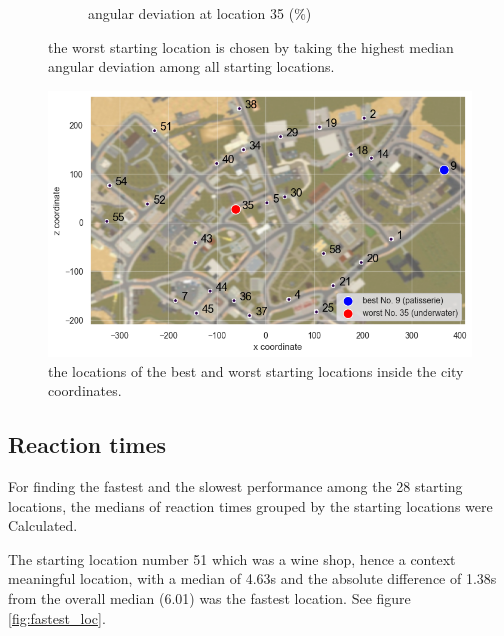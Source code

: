 \begin{figure}[!htb]
\begin{subfigure}[b]{0.48\linewidth}
		\caption{angular deviation at location 35 (\%)}
		\label{fig:worst_angular_dist_35}
	\end{subfigure}

	\caption[Worst starting location based on angular deviation]{the worst starting location is chosen by taking the highest median angular deviation among all starting locations.}
\end{figure}
\label{fig:worst_location}

\begin{figure}[!htb]
	\centering
	\includegraphics[width=140mm]{figures/best_worst_starting_locations_map.png}
	\caption[Locations of best and worst starting locations in city]{the locations of the best and worst starting locations inside the city coordinates.}
	\label{fig:best_worst_locs}
\end{figure}


\subsection{Reaction times}

For finding the fastest and the slowest performance among the 28 starting locations, the medians of reaction times grouped by the starting locations were Calculated.

The starting location number 51 which was a wine shop, hence a context meaningful location, with a median of 4.63s and the absolute difference of 1.38s from the overall median (6.01) was the fastest location. See figure \ref{fig:fastest_loc}.


